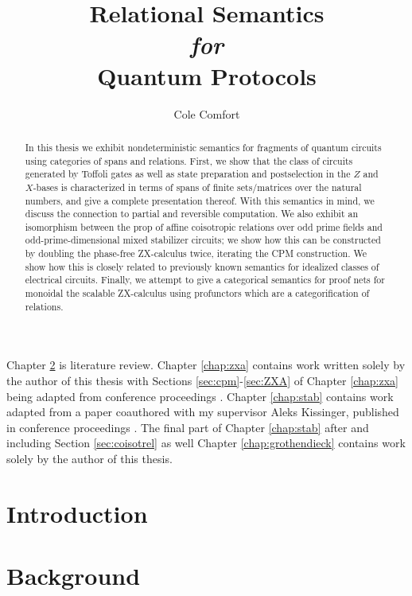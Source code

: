 \documentclass[12pt]{ociamthesis}  %
\title{Relational Semantics \\{ \it \Large for}\\ Quantum Protocols}
\author{Cole Comfort}
\begin{document}
\maketitle


\begin{abstract}
In this thesis we exhibit nondeterministic semantics for fragments of quantum circuits using  categories of spans and relations.  First, we show that the class of circuits generated by Toffoli gates as well as state preparation and postselection in the $Z$ and $X$-bases is characterized in terms of spans of finite sets/matrices over the natural numbers, and give a complete presentation thereof. With this semantics in mind, we discuss the connection to partial and reversible computation. We also exhibit an isomorphism between the prop of affine coisotropic relations over odd prime fields and odd-prime-dimensional mixed stabilizer circuits; we show how this can be constructed by doubling the phase-free ZX-calculus twice, iterating the CPM construction.   We show how this is closely related to previously known semantics for idealized classes of electrical circuits.     Finally, we attempt to give a categorical semantics for proof nets for monoidal the scalable ZX-calculus using profunctors which are a categorification of relations.
\end{abstract}

\begin{originality}
Chapter \ref{chap:background} is  literature review.  Chapter \ref{chap:zxa} contains work written solely by the author of this thesis with Sections \ref{sec:cpm}-\ref{sec:ZXA} of Chapter \ref{chap:zxa} being adapted from conference proceedings \cite{zxa}.  Chapter \ref{chap:stab} contains work adapted from a paper coauthored with my supervisor Aleks Kissinger, published in conference proceedings \cite{lagrel}.  The final part of Chapter  \ref{chap:stab} after and including Section \ref{sec:coisotrel} as well Chapter \ref{chap:grothendieck} contains work solely by the author of this thesis.
\end{originality}

\tableofcontents

\chapter{Introduction}
\label{chap:intro}


\chapter{Background}
\label{chap:background}





\end{document}

